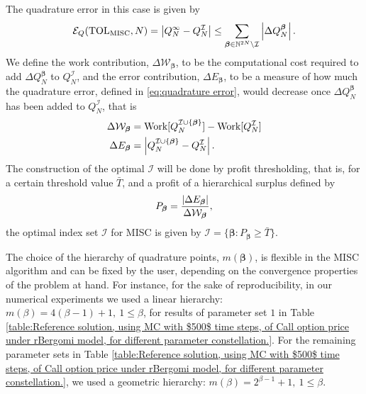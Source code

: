 The quadrature error in this  case  is given by
\begin{equation}\label{eq:quadrature error}
	\mathcal{E}_Q(\text{TOL}_{\text{MISC}},N) =\left\lvert Q_N^\infty - Q_N^\mathcal{I}\right\rvert \le \sum_{\boldsymbol{\beta} \in \mathbb{N}^{2N} \setminus
		\mathcal{I}} \left\lvert\Delta Q_N^{\boldsymbol{\beta}}\right\rvert.
\end{equation}
We define the work contribution, $\Delta \mathcal{W}_{\boldsymbol{\beta}}$, to be the computational cost  required to add  $\Delta Q_N^{\boldsymbol{\beta}}$ to $Q^{\mathcal{I}}_N$, and the error contribution, $\Delta E_{\boldsymbol{\beta}}$, to be  a measure of how much the quadrature error, defined in \eqref{eq:quadrature error}, would decrease once $\Delta Q_N^{\boldsymbol{\beta}}$  has been added to  $Q^{\mathcal{I}}_N$, that is 
\begin{align}\label{eq:Work_error_contributions}
\Delta \mathcal{W}_{\boldsymbol{\beta}} &= \text{Work}[Q^{\mathcal{I} \cup \{\boldsymbol{\beta}\}}_N]-\text{Work}[Q^{\mathcal{I}}_N] \nonumber\\
\Delta E_{\boldsymbol{\beta}} &= \left\lvert Q^{\mathcal{I} \cup \{\boldsymbol{\beta}\}}_N-Q^{\mathcal{I}}_N\right\rvert.
\end{align}
 The  construction of the optimal  $\mathcal{I}$ will be done by profit thresholding, that is, for a certain threshold value $\bar{T}$, and a profit of a hierarchical surplus defined by
 \begin{equation*}
 P_{\boldsymbol{\beta}}= \frac{\left\lvert\Delta E_{\boldsymbol{\beta}}\right\rvert}{\Delta\mathcal{W}_{\boldsymbol{\beta}}},
 \end{equation*}
  the optimal index set  $\mathcal{I}$  for MISC  is given by 
 $\mathcal{I}=\{\boldsymbol{\beta}: P_{\boldsymbol{\beta}}	 \ge \bar{T}\}$.
\begin{remark}
	The choice of the hierarchy of quadrature points, $m(\boldsymbol{\beta})$, is flexible in the MISC algorithm and can be fixed by the user, depending on the convergence properties of the problem at hand. For instance, for the sake of reproducibility, in our numerical experiments we used a linear hierarchy: $m(\beta)=4 (\beta-1)+1,\: 1 \le \beta $, for results of parameter set $1$ in Table \ref{table:Reference solution, using MC with $500$ time steps, of Call option price under rBergomi model, for different parameter constellation.}. For the remaining parameter sets in Table  \ref{table:Reference solution, using MC with $500$ time steps, of Call option price under rBergomi model, for different parameter constellation.}, we used a geometric hierarchy: $m(\beta)=2^{\beta-1}+1, \:1 \le \beta $.
\end{remark} 
